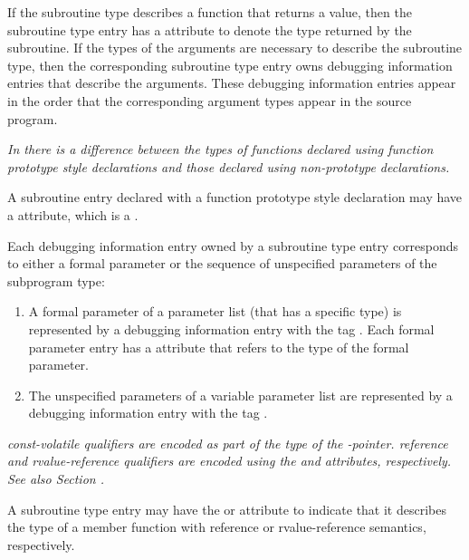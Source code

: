 If the subroutine type describes a function that returns
a value, then the subroutine type entry has a
\DWATtype{}
attribute to denote the type returned by the subroutine. If
the types of the arguments are necessary to describe the
subroutine type, then the corresponding subroutine type
entry owns debugging information entries that describe the
arguments. These debugging information entries appear in the
order that the corresponding argument types appear in the
source program.

\textit{In  there
is a difference between the types of functions
declared using function prototype style declarations and
those declared using non-prototype declarations.}

A
\hypertarget{chap:DWATprototypedsubroutineprototype}{}
subroutine entry declared with a function prototype style
declaration may have
a
\DWATprototypedDEFN{} attribute, which is
a .

Each debugging information entry owned by a subroutine
type entry corresponds to either a formal parameter or the sequence of
unspecified parameters of the subprogram type:

\begin{enumerate}[1. ]
\item A formal parameter of a parameter list (that has a
specific type) is represented by a debugging information entry
with the tag \DWTAGformalparameter.
Each formal parameter
entry has
a \DWATtype{} attribute that refers to the type of
the formal parameter.

\item The unspecified parameters of a variable parameter list
are
represented by a debugging information entry with the
tag \DWTAGunspecifiedparameters.
\end{enumerate}

\textit{ const-volatile qualifiers are encoded as
part of the type of the -pointer.
 reference and rvalue-reference qualifiers are
encoded using the \DWATreference{} and \DWATrvaluereference{} attributes,
respectively.
See also Section .}

A subroutine type entry may have the \DWATreference{} or
\DWATrvaluereference{} attribute to indicate that it describes the
type of a member function with reference or rvalue-reference
semantics, respectively.

